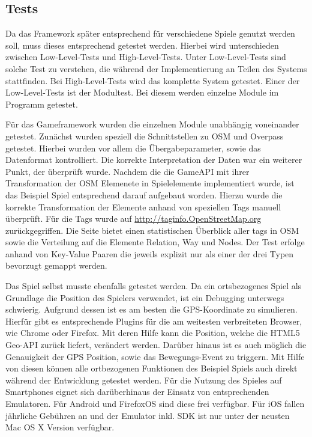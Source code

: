 \subsection*{Tests}

Da das Framework später entsprechend für verschiedene Spiele genutzt werden soll, muss dieses entsprechend getestet werden.
Hierbei wird unterschieden zwischen Low-Level-Tests und High-Level-Tests.\cite{Pol.2002}
Unter Low-Level-Tests sind solche Test zu verstehen, die während der Implementierung an Teilen des Systems stattfinden. Bei High-Level-Tests wird das komplette System getestet. Einer der Low-Level-Tests ist der Modultest. Bei diesem werden einzelne Module im Programm getestet.  

Für das Gameframework wurden die einzelnen Module unabhängig voneinander getestet. Zunächst wurden speziell die Schnittstellen zu OSM und Overpass getestet. Hierbei wurden vor allem  die Übergabeparameter, sowie das Datenformat kontrolliert. Die korrekte Interpretation der Daten war ein weiterer Punkt, der überprüft wurde.
Nachdem die die GameAPI mit ihrer Transformation der OSM Elemenete in Spielelemente implementiert wurde, ist das Beispiel Spiel entsprechend darauf aufgebaut worden. Hierzu wurde die korrekte Transformation der Elemente anhand von speziellen Tags manuell überprüft. Für die Tags wurde auf \url{http://taginfo.OpenStreetMap.org} zurückgegriffen. Die Seite bietet einen statistischen Überblick aller tags in OSM sowie die Verteilung auf die Elemente Relation, Way und Nodes. Der Test erfolge anhand von Key-Value Paaren die jeweils explizit nur als einer der drei Typen bevorzugt gemappt werden.

Das Spiel selbst musste ebenfalls getestet werden. Da ein ortsbezogenes Spiel als Grundlage die Position des Spielers verwendet, ist ein Debugging unterwegs schwierig. Aufgrund dessen ist es am besten die GPS-Koordinate zu simulieren. Hierfür gibt es entsprechende Plugins für die am weitesten verbreiteten Browser, wie Chrome oder Firefox. Mit deren Hilfe kann die Position, welche die HTML5 Geo-API zurück liefert, verändert werden. Darüber hinaus ist es auch möglich die Genauigkeit der GPS Position, sowie das Bewegungs-Event zu triggern. Mit Hilfe von diesen können alle ortbezogenen Funktionen des Beispiel Spiels auch direkt während der Entwicklung getestet werden.
Für die Nutzung des Spieles auf Smartphones eignet sich darüberhinaus der Einsatz von entsprechenden Emulatoren. Für Android und FirefoxOS sind diese frei verfügbar. Für iOS fallen jährliche Gebühren an und der Emulator inkl. SDK ist nur unter der neusten Mac OS X Version verfügbar.

